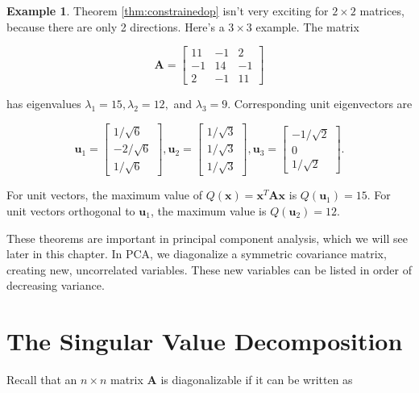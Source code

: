 \documentclass[
]{book}
\theoremstyle{definition}
\theoremstyle{definition}
\newtheorem{example}{Example}[chapter]
\theoremstyle{definition}
\theoremstyle{definition}
\theoremstyle{remark}
\begin{document}
\begin{examplebox}

\begin{example}
Theorem \ref{thm:constrainedop} isn't very exciting for \(2\times 2\) matrices, because there are only 2 directions. Here's a \(3\times 3\) example. The matrix

\[\mathbf{A}=\begin{bmatrix}11 & -1 & 2\\-1 & 14 & -1\\2 & -1 & 11\end{bmatrix}\]

has eigenvalues \(\lambda_1=15,\lambda_2=12,\) and \(\lambda_3=9\). Corresponding unit eigenvectors are

\[\mathbf{u}_1=\begin{bmatrix}1/\sqrt{6}\\-2/\sqrt{6}\\1/\sqrt{6}\end{bmatrix},\mathbf{u}_2=\begin{bmatrix}1/\sqrt{3}\\1/\sqrt{3}\\1/\sqrt{3}\end{bmatrix}, \mathbf{u}_3=\begin{bmatrix}-1/\sqrt{2}\\0\\1/\sqrt{2}\end{bmatrix}.\]

For unit vectors, the maximum value of \(Q(\mathbf{x})=\mathbf{x}^T\mathbf{A}\mathbf{x}\) is \(Q(\mathbf{u}_1)=15\). For unit vectors orthogonal to \(\mathbf{u}_1\), the maximum value is \(Q(\mathbf{u}_2)=12\).
\end{example}

\end{examplebox}

These theorems are important in principal component analysis, which we will see later in this chapter. In PCA, we diagonalize a symmetric covariance matrix, creating new, uncorrelated variables. These new variables can be listed in order of decreasing variance.

\section{The Singular Value Decomposition}\label{SVD}

Recall that an \(n\times n\) matrix \(\mathbf{A}\) is diagonalizable if it can be written as
\end{document}
